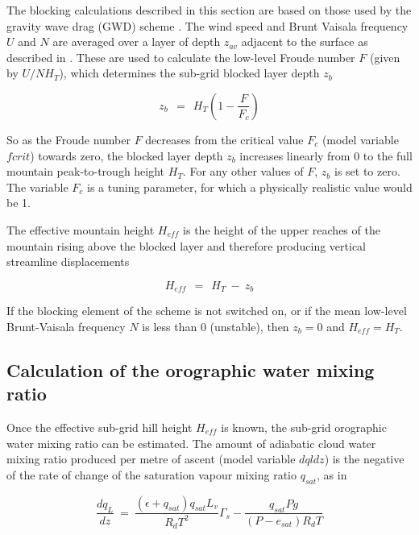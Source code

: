 \documentclass{UMDP_article}
\begin{document}
The blocking calculations described in this section are based on those used by the gravity wave drag (GWD) scheme \cite{Vosper:2015}.  
The wind speed and Brunt Vaisala frequency $U$ and $N$ are averaged over a layer of depth 
$z_{av}$ adjacent to the surface as described in \cite{Vosper:etal:2009}.  These are used to calculate the low-level Froude number $F$ (given by $U / N H_T$), which determines the sub-grid blocked layer depth $z_b$ 

\begin{equation} 
z_b ~~=~~ H_T (1 - \frac{F}{F_c})
\end{equation}

So as the Froude number $F$ decreases from the critical value $F_c$ (model variable $fcrit$) towards zero, the blocked layer depth $z_b$ increases linearly from 0 to the full mountain peak-to-trough height $H_T$.  For any other values of $F$, $z_b$ is set to zero.  
The variable $F_c$ is a tuning parameter, for which a physically realistic value would be 1.  

The effective mountain height $H_{eff}$ is the height of the upper reaches of the mountain rising above the blocked layer and therefore producing vertical streamline displacements 

\begin{equation} 
H_{eff} ~~=~~ H_T ~-~ z_b
\end{equation}

If the blocking element of the scheme is not switched on, or if the mean low-level Brunt-Vaisala frequency $N$ is less than 0 (unstable), then $z_b=$0 and $H_{eff} = H_T$.  

\subsection{Calculation of the orographic water mixing ratio}

Once the effective sub-grid hill height $H_{eff}$ is known, the sub-grid orographic water mixing ratio can be estimated.  The amount of adiabatic cloud water mixing ratio produced per metre of ascent (model variable $dqldz$) is the negative of the rate of change of the saturation vapour mixing ratio $q_{sat}$, as in \cite{Albrecht:etal:1990}

\begin{equation} 
\frac{dq_{L}}{dz} ~=~ \frac{(\epsilon +q_{sat})q_{sat} L_v}{R_d T^2} \Gamma_s  - \frac{q_{sat} P g}{(P - e_{sat}) R_d T}
\end{equation}
\end{document}
